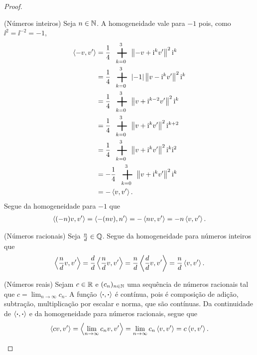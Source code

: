 \begin{proof}
\begin{enumerate}
\begin{enumerate}
	(Números inteiros) Seja $n \in \mathbb{N}$. A homogeneidade vale para $-1$ pois, como $\ii^2 = \ii^{-2} = -1$,
		\begin{align*}
		\inte{-v}{v'} &= \frac{1}{4} \sum_{k=0}^{3} \nor{-v+\ii^kv'}^2 \ii^k \\
			&= \frac{1}{4} \sum_{k=0}^{3} \abs{-1}\nor{v-\ii^kv'}^2 \ii^k \\
			&= \frac{1}{4} \sum_{k=0}^{3} \nor{v+\ii^{k-2}v'}^2 \ii^k \\
			&= \frac{1}{4} \sum_{k=0}^{3} \nor{v+\ii^kv'}^2 \ii^{k+2} \\
			&= \frac{1}{4} \sum_{k=0}^{3} \nor{v+\ii^kv'}^2 \ii^{k}\ii^2 \\
			&= -\frac{1}{4} \sum_{k=0}^{3} \nor{v+\ii^kv'}^2 \ii^{k} \\
			&= -\inte{v}{v'}.
		\end{align*}
	Segue da homogeneidade para $-1$ que
		\begin{align*}
		\left\langle{(-n)v},{v'}\right\rangle = \left\langle{-(nv)},{n'}\right\rangle = -\left\langle{nv},{v'}\right\rangle = -n\left\langle{v},{v'}\right\rangle.
		\end{align*}

	(Números racionais) Seja $\frac{n}{d} \in \mathbb{Q}$. Segue da homogeneidade para números inteiros que
		\begin{align*}
		\left\langle{\frac{n}{d}v},{v'}\right\rangle = \frac{d}{d}\left\langle{\frac{n}{d}v},{v'}\right\rangle = \frac{n}{d}\left\langle{\frac{d}{d}v},{v'}\right\rangle = \frac{n}{d}\left\langle{v},{v'}\right\rangle.
		\end{align*}

	(Números reais) Sejam $c \in \mathbb{R}$ e $(c_n)_{n \in \mathbb{N}}$ uma sequência de números racionais tal que $c = \lim_{n \to \infty} c_n$. A função $\left\langle{\bm{\cdot}},{\bm{\cdot}}\right\rangle$ é contínua, pois é composição de adição, subtração, multiplicação por escalar e norma, que são contínuas. Da continuidade de $\left\langle{\bm{\cdot}},{\bm{\cdot}}\right\rangle$ e da homogeneidade para números racionais, segue que
		\begin{equation*}
		\left\langle{cv},{v'}\right\rangle = \left\langle{\lim_{n \to \infty} c_n v},{v'}\right\rangle = \lim_{n \to \infty} c_n \left\langle{v},{v'}\right\rangle = c \left\langle{v},{v'}\right\rangle.
		\end{equation*}
	\end{enumerate}


\end{enumerate}
\end{proof}
